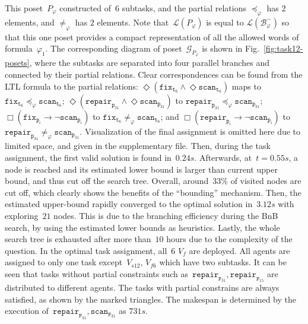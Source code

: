 This poset~$P_{\varphi}$ constructed of~$6$ subtasks,
and the partial relations $\preceq_{\varphi}$ has $2$ elements,
and $\neq_{\varphi}$ has $2$ elements.
 Note that~$\mathcal{L}(P_\varphi)$ is equal to $\mathcal{L}(\mathcal{B}_{\varphi}^-)$ so that
 this one poset provides a compact representation of all the allowed words
 of formula~$\varphi_{1}$.
The corresponding diagram of poset~$\mathcal{G}_{P_\varphi}$ is shown in
Fig.~\ref{fig:task12-posets}, where the subtasks are separated into four
parallel branches and connected by their partial relations.
Clear correspondences can be found from the LTL formula to the partial relations:
$\Diamond ({\texttt{fix}_{\texttt{t}_6}}\wedge \Diamond {\texttt{scan}_{\texttt{t}_6}})$
maps to $\texttt{fix}_{\texttt{t}_6}\preceq_{\varphi} \texttt{scan}_{\texttt{t}_6}$;
$ \Diamond({\texttt{repair}_{\texttt{p}_{31}}}\wedge \Diamond {\texttt{scan}_{\texttt{p}_{31}}})$
to $\texttt{repair}_{\texttt{p}_{31}}\preceq_{\varphi} \texttt{scan}_{\texttt{p}_{31}}$;
$\Box (\texttt{fix}_{\texttt{p}_i}\rightarrow \lnot \texttt{scan}_{\texttt{p}_i})$ to
$\texttt{fix}_{\texttt{t}_6}\neq_{\varphi} \texttt{scan}_{\texttt{t}_6}$;
 and $\Box (\texttt{repair}_{\texttt{p}_i}\rightarrow \lnot \texttt{scan}_{\texttt{p}_i})$ to
 $\texttt{repair}_{\texttt{p}_{31}}\neq_{\varphi} \texttt{scan}_{\texttt{p}_{31}}$.
Visualization of the final assignment is omitted here due to limited space,
and given in the supplementary file.
Then, during the task assignment,
the first valid solution is found in~$0.24s$.
Afterwards, at~$t=0.55s$, a node is reached and its estimated lower
bound is larger than current upper bound, and thus cut off the search tree.
Overall, around~$33\%$ of visited nodes are cut off,
which clearly shows the benefits of the ``bounding'' mechanism.
Then, the estimated upper-bound rapidly converged
to the optimal solution in~$3.12s$ with exploring~$21$ nodes.
This is due to the branching efficiency during the BnB search,
by using the estimated lower bounds as heuristics.
Lastly, the whole search tree is exhausted after more than~$10$ hours
due to the complexity of the question.
In the optimal task assignment, all~$6$ $V_f$ are deployed.
All agents are assigned to only one task except~$V_{s12}$, $V_{f6}$
which have two subtasks.
It can be seen that tasks without partial constraints
such as~$\texttt{repair}_{\texttt{P}_{31}}, \texttt{repair}_{\texttt{P}_{15}}$
are distributed to different agents. The tasks with partial constrains
are always satisfied, as shown by the marked triangles.
The makespan is determined by the execution of~$\texttt{repair}_{\texttt{P}_{31}},
\texttt{scan}_{\texttt{P}_{31}}$ as $731s$.




